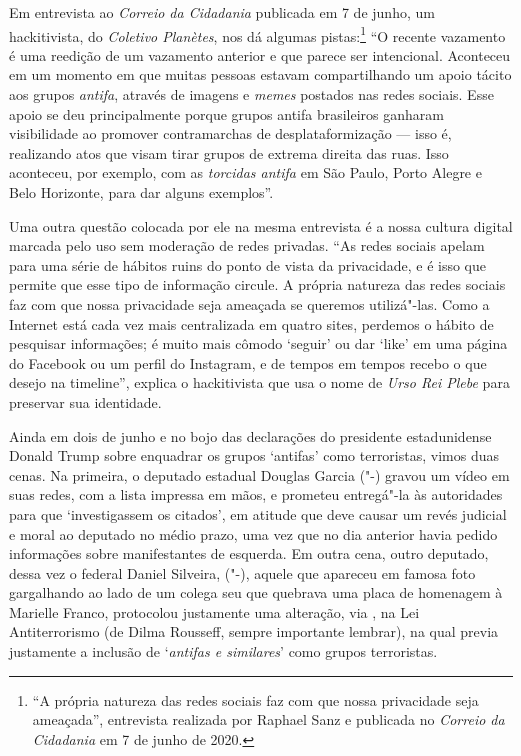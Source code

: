 Em entrevista ao \emph{Correio da Cidadania} publicada em 7 de junho, um
hackitivista, do \emph{Coletivo Planètes}, nos dá algumas pistas:\footnote{``A própria natureza das redes sociais faz com que nossa
privacidade seja ameaçada'', entrevista realizada por Raphael Sanz e
publicada no \emph{Correio da Cidadania} em 7 de junho de
2020.} ``O
recente vazamento é uma reedição de um vazamento anterior e que parece
ser intencional. Aconteceu em um momento em que muitas pessoas estavam
compartilhando um apoio tácito aos grupos \emph{antifa}, através de
imagens e \emph{memes} postados nas redes sociais. Esse apoio se deu
principalmente porque grupos antifa brasileiros ganharam visibilidade ao
promover contramarchas de desplataformização --- isso é, realizando atos
que visam tirar grupos de extrema direita das ruas. Isso aconteceu, por
exemplo, com as \emph{torcidas antifa} em São Paulo, Porto Alegre e Belo
Horizonte, para dar alguns exemplos''.

Uma outra questão colocada por ele na mesma entrevista é a nossa cultura
digital marcada pelo uso sem moderação de redes privadas. ``As redes
sociais apelam para uma série de hábitos ruins do ponto de vista da
privacidade, e é isso que permite que esse tipo de informação circule. A
própria natureza das redes sociais faz com que nossa privacidade seja
ameaçada se queremos utilizá"-las. Como a Internet está cada vez mais
centralizada em quatro sites, perdemos o hábito de pesquisar
informações; é muito mais cômodo `seguir' ou dar `like' em uma página do
Facebook ou um perfil do Instagram, e de tempos em tempos recebo o que
desejo na timeline'', explica o hackitivista que usa o nome de
\emph{Urso Rei Plebe} para preservar sua identidade.

Ainda em dois de junho e no bojo das declarações do presidente
estadunidense Donald Trump sobre enquadrar os grupos `antifas' como
terroristas, vimos duas cenas. Na primeira, o deputado estadual Douglas
Garcia ("-) gravou um vídeo em suas redes, com a lista impressa em
mãos, e prometeu entregá"-la às autoridades para que `investigassem os
citados', em atitude que deve causar um revés judicial e moral ao
deputado no médio prazo, uma vez que no dia anterior havia pedido
informações sobre manifestantes de esquerda. Em outra cena, outro
deputado, dessa vez o federal Daniel Silveira, ("-), aquele que
apareceu em famosa foto gargalhando ao lado de um colega seu que
quebrava uma placa de homenagem à Marielle Franco, protocolou justamente
uma alteração, via , na Lei Antiterrorismo (de Dilma Rousseff, sempre
importante lembrar), na qual previa justamente a inclusão de
`\emph{antifas e similares}' como grupos terroristas.

